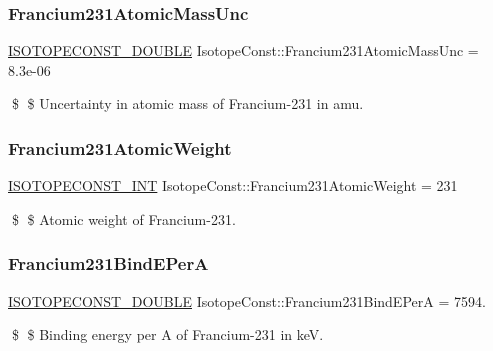 \subsubsection{\texorpdfstring{Francium231\+Atomic\+Mass\+Unc}{Francium231AtomicMassUnc}}
{\footnotesize\ttfamily \mbox{\hyperlink{group___isotope_const-_macros_ga8f45a7272ce02c0b4c65c44636ed719a}{I\+S\+O\+T\+O\+P\+E\+C\+O\+N\+S\+T\+\_\+\+D\+O\+U\+B\+LE}} Isotope\+Const\+::\+Francium231\+Atomic\+Mass\+Unc = 8.\+3e-\/06}

\$ \$ Uncertainty in atomic mass of Francium-\/231 in amu. \mbox{\label{group___isotope_const-_francium-_fr231_gac36a7d0bfe4f49a828673710e8c5387d}} 
\subsubsection{\texorpdfstring{Francium231\+Atomic\+Weight}{Francium231AtomicWeight}}
{\footnotesize\ttfamily \mbox{\hyperlink{group___isotope_const-_macros_ga5f18360b3e99483a35c32d789e62621c}{I\+S\+O\+T\+O\+P\+E\+C\+O\+N\+S\+T\+\_\+\+I\+NT}} Isotope\+Const\+::\+Francium231\+Atomic\+Weight = 231}

\$ \$ Atomic weight of Francium-\/231. \mbox{\label{group___isotope_const-_francium-_fr231_gaf126fa3a0bc3f3ec19ea1e0f6cc70e8d}} 
\subsubsection{\texorpdfstring{Francium231\+Bind\+E\+PerA}{Francium231BindEPerA}}
{\footnotesize\ttfamily \mbox{\hyperlink{group___isotope_const-_macros_ga8f45a7272ce02c0b4c65c44636ed719a}{I\+S\+O\+T\+O\+P\+E\+C\+O\+N\+S\+T\+\_\+\+D\+O\+U\+B\+LE}} Isotope\+Const\+::\+Francium231\+Bind\+E\+PerA = 7594.}

\$ \$ Binding energy per A of Francium-\/231 in keV. \mbox{\label{group___isotope_const-_francium-_fr231_gaf07ebb822318f37e49f9e1ac2d400c20}} 
